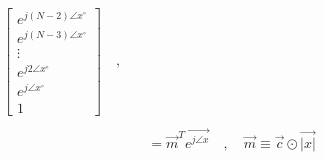 \documentclass{article}
\begin{document}
\begin{align*}
\begin{bmatrix}
                                                e^{j(N - 2)\angle{x}^{\circ}} \\
                                                e^{j(N - 3)\angle{x}^{\circ}} \\
                                                \vdots \\
                                                e^{j2\angle{x}^{\circ}} \\
                                                e^{j\angle{x}^{\circ}} \\
                                                1
                                              \end{bmatrix} \quad , \quad \\ \\
            &= \vec{m}^{T}\vec{e^{j\angle{x}}} \quad , \quad \vec{m} \equiv \vec{c} \odot \vec{|x|} 
\end{align*}
\end{document}
